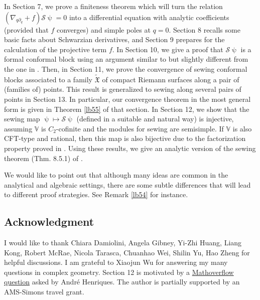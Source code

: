 \documentclass[11pt,b5paper,notitlepage]{article}
\theoremstyle{definition}
\theoremstyle{plain}
\newcommand{\fk}{\mathfrak}
\newcommand{\mc}{\mathcal}
\newcommand{\wtd}{\widetilde}
\newcommand{\Vbb}{\mathbb V}
\numberwithin{equation}{section}
\begin{document}
In Section 7, we prove a finiteness theorem which will turn the relation $(\nabla_{q\partial_q}+f)\mc S\uppsi=0$ into a differential equation with analytic coefficients (provided that $f$ converges) and simple poles at $q=0$. Section 8 recalls some basic facts about Schwarzian derivatives, and Section 9 prepares for the calculation of the projective term $f$. In Section 10, we give a proof that $\mc S\uppsi$ is a formal conformal block using an argument similar to but slightly different from the one in \cite{DGT19b}. Then, in Section 11,  we prove the convergence of sewing conformal blocks associated to a family $\wtd{\fk X}$ of compact Riemann surfaces along a pair of (families of) points. This result is generalized to sewing along several pairs of points in Section 13. In particular, our convergence theorem in the most general form is given in Theorem \ref{lb55} of that section. In Section 12, we show that the sewing map $\uppsi\mapsto\mc S\uppsi$ (defined in a suitable and natural way) is injective, assuming $\Vbb$ is $C_2$-cofinite and the modules for sewing are semisimple.  If $\Vbb$ is also CFT-type and rational, then this map is also bijective due to the factorization property proved in \cite{DGT19b}.  Using these results, we give an analytic version of the sewing theorem (Thm. 8.5.1) of \cite{DGT19b}.



We would like to point out that although many ideas are common in the analytical and algebraic settings, there are some subtle differences that will lead to different proof strategies. See Remark \ref{lb54} for instance. 







\subsection*{Acknowledgment}

I would like to thank Chiara Damiolini, Angela Gibney, Yi-Zhi Huang, Liang Kong, Robert McRae, Nicola Tarasca, Chuanhao Wei, Shilin Yu, Hao Zheng for helpful discussions. I am grateful to Xiaojun Wu for answering my many questions in complex geometry. Section 12 is motivated by a  \href{https://mathoverflow.net/questions/300460/linear-independence-of-genus-one-correlation-functions/321362#321362}{Mathoverflow question}  asked by Andr\'e Henriques. The author is partially supported by an AMS-Simons travel grant.
\end{document}
